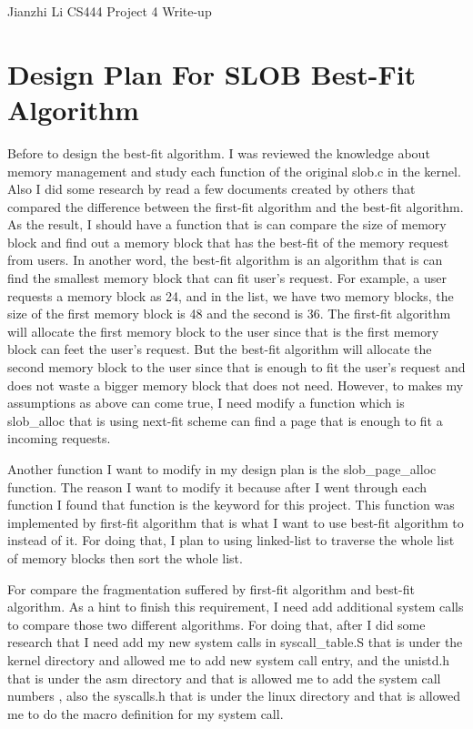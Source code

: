 \documentclass[letterpaper,11pt,titlepage]{article}
\begin{document}
Jianzhi Li\newline
CS444 Project 4 Write-up

\section{Design Plan For SLOB Best-Fit Algorithm}

Before to design the best-fit algorithm. I was reviewed the knowledge about memory management and study each function of the original slob.c in the kernel. Also I did 
some research by read a few documents created by others that compared the difference between the first-fit algorithm and the best-fit algorithm. As the result, I should have a 
function that is can compare the size of memory block and find out a memory block that has the best-fit of the memory request from users. In another word, the best-fit algorithm 
is an algorithm that is can find the smallest memory block that can fit user's request. For example, a user requests a memory block as 24, and in the list, we have two memory blocks, 
the size of the first memory block is 48 and the second is 36. The first-fit algorithm will allocate the first memory block to the user since that is the first memory block can
feet the user's request. But the best-fit algorithm will allocate the second memory block to the user since that is enough to fit the user's request and does not waste a bigger memory block 
that does not need. However, to makes my assumptions as above can come true, I need modify a function which is slob_alloc that is using next-fit scheme can find a page that is enough to fit a 
incoming requests.

Another function I want to modify in my design plan is the slob_page_alloc function. The reason I want to modify it because after I went through each function I found that function is the keyword
for this project. This function was implemented by first-fit algorithm that is what I want to use best-fit algorithm to instead of it. For doing that, I plan to using linked-list to traverse the whole list
of memory blocks then sort the whole list. 
    
For compare the fragmentation suffered by first-fit algorithm and best-fit algorithm. As a hint to finish this requirement, I need add additional system calls to compare those two different algorithms. For doing that,
after I did some research that I need add my new system calls in syscall_table.S that is under the kernel directory and allowed me to add new system call entry, and the unistd.h that is under the asm directory and that is allowed me to add the system call numbers
, also the syscalls.h that is under the linux directory and that is allowed me to do the macro definition for my system call.  
\end{document}

